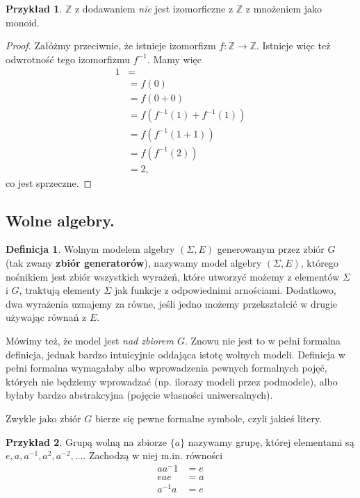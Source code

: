 \documentclass{article}
\theoremstyle{definition}
\newtheorem{definition}{Definicja}[section]
\newtheorem{example}{Przykład}[section]
\begin{document}
\begin{example}
	$\mathbb{Z}$ z dodawaniem \textit{nie} jest izomorficzne z $\mathbb{Z}$ z mnożeniem jako monoid.
\end{example}
\begin{proof}
	Załóżmy przeciwnie,
		że istnieje izomorfizm $f: \mathbb{Z} \to \mathbb{Z}$.
	Istnieje więc też odwrotność tego izomorfizmu $f^{-1}$.
	Mamy więc
	\begin{align}
		1 &= \\
	      &= f(0) \\
	      &= f(0 + 0) \\
	      &= f(f^{-1}(1) + f^{-1}(1)) \\
	      &= f(f^{-1}(1 + 1)) \\
	      &= f(f^{-1}(2)) \\
	      &= 2,
	\end{align}
	co jest sprzeczne.
\end{proof}

\subsection{Wolne algebry.}

\begin{definition}
    Wolnym modelem algebry $(\Sigma, E)$ generowanym przez zbiór $G$ (tak zwany \textbf{zbiór generatorów}),
    nazywamy model algebry $(\Sigma, E)$, którego nośnikiem jest zbiór wszystkich wyrażeń,
		które utworzyć możemy z elementów $\Sigma$ i $G$, traktują elementy $\Sigma$ jak
		funkcje z odpowiednimi arnościami.
	Dodatkowo,
		dwa wyrażenia uznajemy za równe,
		jeśli jedno możemy przekształcić w drugie używając równań z $E$.
\end{definition}
Mówimy też, że model jest \textit{nad zbiorem $G$}.
Znowu nie jest to w pełni formalna definicja,
	jednak bardzo intuicyjnie oddająca istotę wolnych modeli.
Definicja w pełni formalna wymagałaby albo wprowadzenia pewnych formalnych pojęć,
	których nie będziemy wprowadzać (np. ilorazy modeli przez podmodele),
	albo byłaby bardzo abstrakcyjna (pojęcie własności uniwersalnych).

Zwykle jako zbiór $G$ bierze się pewne formalne symbole, czyli jakieś litery.

\begin{example}
	Grupą wolną na zbiorze $\{a\}$ nazywamy grupę, której elementami są
	$e, a, a^{-1}, a^2, a^{-2}, \dots$.
	Zachodzą w niej m.in. równości
	\begin{align}
		aa{^-1} &= e \\
		eae &= a \\
		a^{-1}a &= e
	\end{align}
\end{example}
\end{document}
